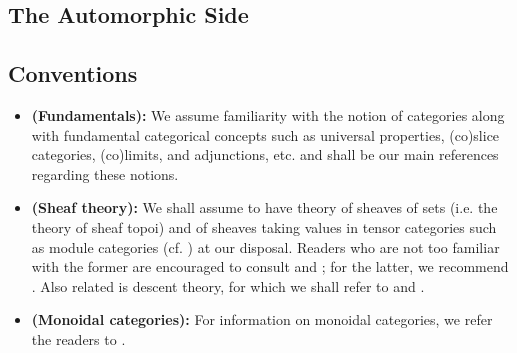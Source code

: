     \subsection{The Automorphic Side}
        
    \subsection{Conventions}
        \begin{convention} \label{conv: category_theory}
            \noindent
            \begin{itemize}
                \item \textbf{(Fundamentals):} We assume familiarity with the notion of categories along with fundamental categorical concepts such as universal properties, (co)slice categories, (co)limits, and adjunctions, etc. \cite{maclane} and \cite[\href{https://stacks.math.columbia.edu/tag/0011}{Tag 0011}]{stacks} shall be our main references regarding these notions.
                \item \textbf{(Sheaf theory):} We shall assume to have theory of sheaves of sets (i.e. the theory of sheaf topoi) and of sheaves taking values in tensor categories such as module categories (cf. \cite{EGNO}) at our disposal. Readers who are not too familiar with the former are encouraged to consult \cite{sga4} and \cite[\href{https://stacks.math.columbia.edu/tag/00UZ}{Tag 00UZ}]{stacks}; for the latter, we recommend \cite[\href{https://stacks.math.columbia.edu/tag/006A}{Tag 006A}, \href{https://stacks.math.columbia.edu/tag/01AC}{Tag 01AC}, and \href{https://stacks.math.columbia.edu/tag/03A4}{Tag 03A4}]{stacks}. Also related is descent theory, for which we shall refer to \cite{vistoli_descent} and \cite[\href{https://stacks.math.columbia.edu/tag/0266}{Tag 0266} and \href{https://stacks.math.columbia.edu/tag/0238}{Tag 0238}]{stacks}.
                \item \textbf{(Monoidal categories):} For information on monoidal categories, we refer the readers to \cite{EGNO}.
            \end{itemize}
        \end{convention}
        
